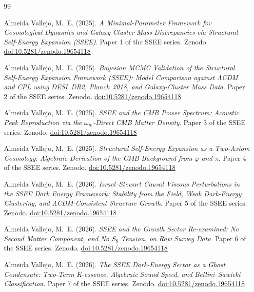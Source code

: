 \documentclass[12pt,a4paper]{article}
\begin{document}
\clearpage
\begin{thebibliography}{99}

  Almeida Vallejo, M.~E. (2025).
  \textit{A Minimal-Parameter Framework for Cosmological Dynamics and Galaxy
  Cluster Mass Discrepancies via Structural Self-Energy Expansion (SSEE)}.
  Paper 1 of the SSEE series. Zenodo. \href{https://doi.org/10.5281/zenodo.19654118}{doi:10.5281/zenodo.19654118}

  Almeida Vallejo, M.~E. (2025).
  \textit{Bayesian MCMC Validation of the Structural Self-Energy Expansion
  Framework (SSEE): Model Comparison against $\Lambda$CDM and CPL using
  DESI~DR2, Planck~2018, and Galaxy-Cluster Mass Data}.
  Paper 2 of the SSEE series. Zenodo. \href{https://doi.org/10.5281/zenodo.19654118}{doi:10.5281/zenodo.19654118}

  Almeida Vallejo, M.~E. (2025).
  \textit{SSEE and the CMB Power Spectrum: Acoustic Peak Reproduction via
  the $\omega_m$-Direct CMB Matter Density}.
  Paper 3 of the SSEE series. Zenodo. \href{https://doi.org/10.5281/zenodo.19654118}{doi:10.5281/zenodo.19654118}

  Almeida Vallejo, M.~E. (2025).
  \textit{Structural Self-Energy Expansion as a Two-Axiom Cosmology:
  Algebraic Derivation of the CMB Background from $\varphi$ and $\pi$}.
  Paper 4 of the SSEE series. Zenodo. \href{https://doi.org/10.5281/zenodo.19654118}{doi:10.5281/zenodo.19654118}

  Almeida Vallejo, M.~E. (2026).
  \textit{Israel--Stewart Causal Viscous Perturbations in the SSEE Dark
  Energy Framework: Stability from the Field, Weak Dark-Energy Clustering, and
  $\Lambda$CDM-Consistent Structure Growth}.
  Paper 5 of the SSEE series. Zenodo. \href{https://doi.org/10.5281/zenodo.19654118}{doi:10.5281/zenodo.19654118}

  Almeida Vallejo, M.~E. (2026).
  \textit{SSEE and the Growth Sector Re-examined: No Second Matter
  Component, and No $S_8$ Tension, on Raw Survey Data}.
  Paper 6 of the SSEE series. Zenodo. \href{https://doi.org/10.5281/zenodo.19654118}{doi:10.5281/zenodo.19654118}

  Almeida Vallejo, M.~E. (2026).
  \textit{The SSEE Dark-Energy Sector as a Ghost Condensate: Two-Term
  K-essence, Algebraic Sound Speed, and Bellini--Sawicki Classification}.
  Paper 7 of the SSEE series. Zenodo. \href{https://doi.org/10.5281/zenodo.19654118}{doi:10.5281/zenodo.19654118}


\end{thebibliography}
\end{document}
